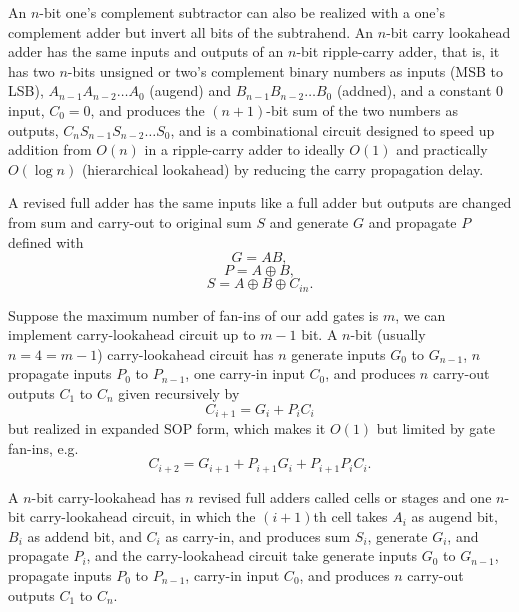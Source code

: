 \documentclass[a4paper,12pt]{article}
\begin{document}
\begin{itemize}
\begin{itemize}
\begin{itemize}
\begin{itemize}
\begin{itemize}
\begin{itemize}
\begin{itemize}
An $n$-bit one's complement subtractor can also be realized with a one's complement adder but invert all bits of the subtrahend.
An $n$-bit carry lookahead adder has the same inputs and outputs of an $n$-bit ripple-carry adder, that is, it has two $n$-bits unsigned or two's complement binary numbers as inputs (MSB to LSB), $A_{n-1}A_{n-2}\ldots A_0$ (augend) and $B_{n-1}B_{n-2}\ldots B_0$ (addned), and a constant $0$ input, $C_0=0$, and produces the $(n+1)$-bit sum of the two numbers as outputs, $C_nS_{n-1}S_{n-2}\ldots S_0$, and is a combinational circuit designed to speed up addition from $O(n)$ in a ripple-carry adder
to ideally $O(1)$ and practically $O(\log n)$ (hierarchical lookahead) by reducing the carry propagation delay.

A revised full adder has the same inputs like a full adder but outputs are changed from sum and carry-out to original sum $S$ and generate $G$ and propagate $P$ defined with
\[G=AB,\]
\[P=A\oplus B,\]
\[S=A\oplus B\oplus C_{in}.\]

Suppose the maximum number of fan-ins of our add gates is $m$, we can implement carry-lookahead circuit up to $m-1$ bit. A $n$-bit (usually $n=4=m-1$) carry-lookahead circuit has $n$ generate inputs $G_0$ to $G_{n-1}$, $n$ propagate inputs $P_0$ to $P_{n-1}$, one carry-in input $C_0$, and produces $n$ carry-out outputs $C_1$ to $C_n$ given recursively by
\[C_{i+1}=G_i+P_iC_i\]
but realized in expanded SOP form, which makes it $O(1)$ but limited by gate fan-ins, e.g.
\[C_{i+2}=G_{i+1}+P_{i+1}G_i+P_{i+1}P_iC_i.\]

A $n$-bit carry-lookahead has $n$ revised full adders called cells or stages and one $n$-bit carry-lookahead circuit, in which the $(i+1)$th cell takes $A_i$ as augend bit, $B_i$ as addend bit, and $C_i$ as carry-in, and produces sum $S_i$, generate $G_i$, and propagate $P_i$, and the carry-lookahead circuit take generate inputs $G_0$ to $G_{n-1}$, propagate inputs $P_0$ to $P_{n-1}$, carry-in input $C_0$, and produces $n$ carry-out outputs $C_1$ to $C_n$.


\end{itemize}
\end{itemize}
\end{itemize}
\end{itemize}
\end{itemize}
\end{itemize}
\end{itemize}
\end{document}
